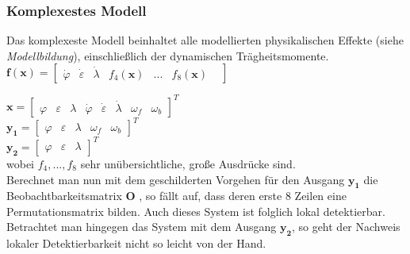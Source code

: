 \documentclass[times, 10pt,twocolumn]{article}
\begin{document}
	\subsubsection{Komplexestes Modell}
	Das komplexeste Modell beinhaltet alle modellierten physikalischen Effekte (siehe \textit{Modellbildung}), einschließlich der dynamischen Trägheitsmomente. \\
	$\bm f(\bm x) = \begin{bmatrix}
	\dot \varphi &
	\dot \varepsilon &
	\dot \lambda  &
	f_4(\bm x) &
	... &
	f_8(\bm x) &
	\end{bmatrix} $ \\ 

	$\bm x = \begin{bmatrix}
	\varphi & \varepsilon & \lambda & \dot \varphi & \dot \varepsilon & \dot \lambda & \omega_f & \omega_b
	\end{bmatrix}^T $ \\ 
	$\bm {y_1} = \begin{bmatrix}
	\varphi & \varepsilon & \lambda & \omega_f & \omega_b
	\end{bmatrix}^T $ \\
	$\bm {y_2} = \begin{bmatrix}
	\varphi & \varepsilon & \lambda 
	\end{bmatrix}^T $ \\ wobei $f_4, ..., f_8$ sehr unübersichtliche, große Ausdrücke sind. \\
	Berechnet man nun mit dem geschilderten Vorgehen für den Ausgang $\bm{y_1}$
	die Beobachtbarkeitsmatrix $\bm O$ , so fällt auf, dass deren erste 8 Zeilen eine Permutationsmatrix bilden. Auch dieses System ist folglich lokal detektierbar. \\
	Betrachtet man hingegen das System mit dem Ausgang $\bm{y_2}$, so geht der Nachweis lokaler Detektierbarkeit nicht so leicht von der Hand. 
\end{document}
